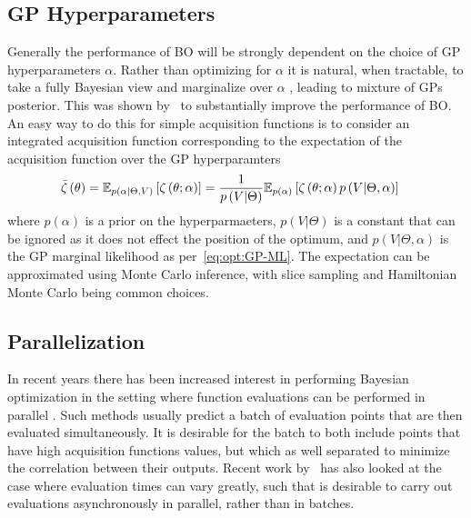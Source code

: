 \subsection{GP Hyperparameters}
\label{sec:opt:BO:hyp}

Generally the performance of BO will be strongly dependent on the choice of GP
 hyperparameters $\alpha$.  Rather than optimizing for $\alpha$ it is natural, 
 when tractable, to take a fully Bayesian view and marginalize
 over $\alpha$ \cite{osborne2009gaussian}, leading to
 mixture of GPs posterior.  This was shown
 by~\cite{snoek2012practical} to substantially improve the performance of BO.
 An easy way to do this for simple acquisition functions is to consider an
 integrated acquisition function corresponding to the expectation of the acquisition
 function over the GP hyperparamters~\citep{snoek2012practical}
\begin{align}
\label{eq:opt:intAcq}
\bar{\zeta}\left(\theta \right) &= \mathbb{E}_{p\left(\alpha | \Theta, V\right)}
\left[  \zeta\left(\theta  ; \alpha\right)  \right] = \frac{1}{p\left(V | \Theta \right)} \mathbb{E}_{p\left(\alpha \right)}
\left[  \zeta\left(\theta  ; \alpha\right)  p\left(V | \Theta, \alpha\right)\right]
\end{align}
where $p(\alpha)$ is a prior on the hyperparmaeters, $p\left(V | \Theta \right)$ is
a constant that can be ignored as it does not effect the position of the optimum, and
$p\left(V | \Theta, \alpha\right)$ is the GP marginal likelihood as per~\eqref{eq:opt:GP-ML}.
The expectation can be approximated using Monte Carlo inference, with slice sampling
\citep{murray2010slice} and Hamiltonian Monte Carlo \citep{hensman2015mcmc}
being common choices.

\subsection{Parallelization}
\label{sec:opt:BO:parallel}

In recent years there has been increased interest in performing Bayesian optimization in the setting
where function evaluations can be performed in parallel
\citep{contal2013parallel,desautels2014parallelizing,gonzalez2016batch,kathuria2016batched}. 
Such methods usually predict a batch of
evaluation points that are then evaluated simultaneously.
It is desirable for the batch to both include points that have high acquisition functions values, but
which as well separated to minimize the correlation between their outputs.  Recent work by~\cite{kandasamy2017asynchronous}
has also looked at the case where evaluation times can vary greatly, such that is desirable to
carry out evaluations asynchronously in parallel, rather than in batches.

